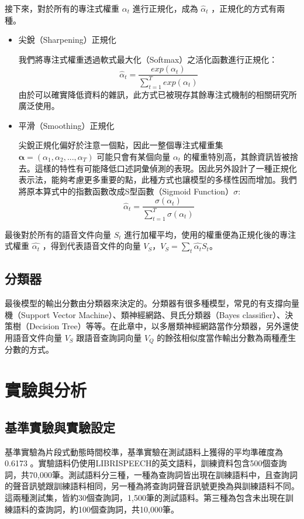 接下來，對於所有的專注式權重 $\alpha_t$ 進行正規化，成為
$\hat{\alpha}_t$ ，正規化的方式有兩種。
\begin{itemize}
	\item{尖銳（Sharpening）正規化}
		
		我們將專注式權重透過軟式最大化（Softmax）之活化函數進行正規化：
		\begin{equation}
			\hat{\alpha}_t =
			\frac{exp(\alpha_t)}{\sum_{t=1}^{T} exp(\alpha_t)}
		\end{equation}
		由於可以確實降低資料的雜訊，此方式已被現存其餘專注式機制的相關研究所廣泛使用。
	\item{平滑（Smoothing）正規化}
		
		尖銳正規化偏好於注意一個點，因此一整個專注式權重集 $
		\boldsymbol{\alpha}
		= (\alpha_1,\alpha_2, ...,
		\alpha_T)$
		可能只會有某個向量 $\alpha_t$ 的權重特別高，其餘資訊皆被捨去。這樣的特性有可能降低口述詞彙偵測的表現。因此另外設計了一種正規化表示法，能夠考慮更多重要的點，此種方式也讓模型的多樣性因而增加。我們將原本算式中的指數函數改成S型函數（Sigmoid Function）$\sigma$:
		\begin{equation}
			\hat{\alpha}_t =
			\frac{\sigma(\alpha_t)}{\sum_{t=1}^{T}\sigma(\alpha_t)}
		\end{equation}

\end{itemize}

最後對於所有的語音文件向量 $S_t$
進行加權平均，使用的權重便為正規化後的專注式權重 $\hat{\alpha_t}$
，得到代表語音文件的向量 $V_S$，$V_S
= \sum_{t} \hat{\alpha_t} S_t$。
\label{ch4_doc_vec}
\subsection{分類器}
最後模型的輸出分數由分類器來決定的。分類器有很多種模型，常見的有支撐向量機（Support
Vector Machine）、類神經網路、貝氏分類器（Bayes
classifier）、決策樹（Decision
Tree）等等。在此章中，以多層類神經網路當作分類器，另外還使用語音文件向量 $V_S$
跟語音查詢詞向量 $V_Q$ 的餘弦相似度當作輸出分數為兩種產生分數的方式。
\label{ch4_classify}
\section{實驗與分析}
\subsection{基準實驗與實驗設定}
基準實驗為片段式動態時間校準，基準實驗在測試語料上獲得的平均準確度為
0.6173
。實驗語料仍使用LIBRISPEECH的英文語料，訓練資料包含500個查詢詞，共70,000筆。測試語料分三種，一種為查詢詞皆出現在訓練語料中，且查詢詞的聲音訊號跟訓練語料相同，另一種為將查詢詞聲音訊號更換為與訓練語料不同。這兩種測試集，皆約30個查詢詞，1,500筆的測試語料。第三種為包含未出現在訓練語料的查詢詞，約100個查詢詞，共10,000筆。

